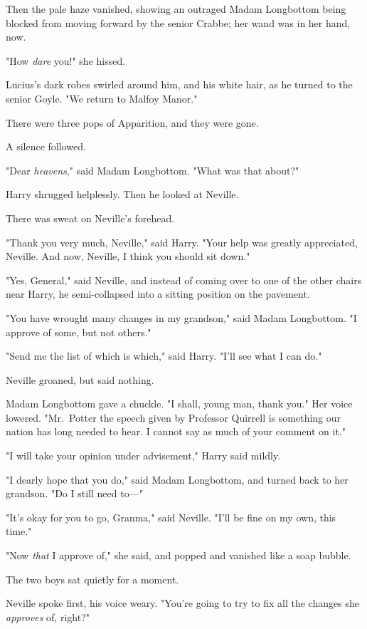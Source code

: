 Then the pale haze vanished, showing an outraged Madam Longbottom being blocked
from moving forward by the senior Crabbe; her wand was in her hand, now.

"How \emph{dare} you!" she hissed.

Lucius's dark robes swirled around him, and his white hair, as he turned to the
senior Goyle. "We return to Malfoy Manor."

There were three pops of Apparition, and they were gone.

A silence followed.

"Dear \emph{heavens}," said Madam Longbottom. "What was that about?"

Harry shrugged helplessly. Then he looked at Neville.

There was sweat on Neville's forehead.

"Thank you very much, Neville," said Harry. "Your help was greatly appreciated,
Neville. And now, Neville, I think you should sit down."

"Yes, General," said Neville, and instead of coming over to one of the other
chairs near Harry, he semi-collapsed into a sitting position on the pavement.

"You have wrought many changes in my grandson," said Madam Longbottom. "I
approve of some, but not others."

"Send me the list of which is which," said Harry. "I'll see what I can do."

Neville groaned, but said nothing.

Madam Longbottom gave a chuckle. "I shall, young man, thank you." Her voice
lowered. "Mr.~Potter{\el} the speech given by Professor Quirrell is
something our nation has long needed to hear. I cannot say as much of your
comment on it."

"I will take your opinion under advisement," Harry said mildly.

"I dearly hope that you do," said Madam Longbottom, and turned back to her
grandson. "Do I still need to\mbox{---}"

"It's okay for you to go, Granma," said Neville. "I'll be fine on my own, this
time."

"Now \emph{that} I approve of," she said, and popped and vanished like a soap
bubble.

The two boys sat quietly for a moment.

Neville spoke first, his voice weary. "You're going to try to fix all the
changes she \emph{approves} of, right?"

